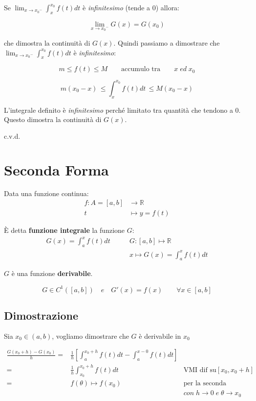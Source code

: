\documentclass[../dimostrazioni]{subfiles}
\begin{document}
                Se \( \lim_{x \to {x_0}^{-}} \int_{x}^{x_0} f(t) dt \) è \emph{infinitesimo} (tende a 0) allora:

                \[  \lim_{x \to {x_0}^{-}}G(x) = G(x_0) \]

                che dimostra la continuità di \(G(x)\). Quindi passiamo a dimostrare che \( \lim_{x \to {x_0}^{-}} \int_{x}^{x_0} f(t) dt \) è \emph{infinitesimo}:

                \[m \leqslant f(t) \leqslant M \qquad \text {accumulo tra} \qquad x \; ed \; x_0 \]

                \[m(x_0-x) \, \leqslant \int_{x}^{x_0} f(t) dt \, \leqslant M(x_0-x) \]

                L'integrale definito è \emph{infinitesimo} perché limitato tra quantità che tendono a 0. Questo dimostra la continuità di \(G(x)\).

                c.v.d.
            
        \section*{Seconda Forma}

        Data una funzione continua:
        \begin{align*}
            f : A = [a, b] &\longrightarrow \mathbb{R}\\
            t &\longmapsto y = f(t) 
        \end{align*}

        È detta \textbf{funzione integrale} la funzione \(G\):
        \begin{align*}
            G(x) = \int_{a}^{x} f(t) dt \qquad   &{G : [a, b] \longmapsto \mathbb{R}} \\
            &{x \longmapsto G(x) = \int_{a}^{x} f(t) dt}
        \end{align*}

        \(G\) è una funzione \textbf{derivabile}.

        \[G \in C^{1}([a, b]) \quad e \quad G'(x) = f(x) \qquad \forall x \in [a,b] \]
        
            \subsection*{Dimostrazione}

                Sia \(x_0 \in (a,b) \), vogliamo dimostrare che \(G\) è derivabile in \(x_0\)

                \begin{align*}
                    \frac{G(x_0+h) - G(x_0)}{h} =& \frac{1}{h} \left[ \int_{a}^{x_0+h} f(t) dt - \int_{a}^{x-0} f(t)dt \right] \\
                    =& \frac{1}{h} \int_{x_0}^{x_0+h}f(t) dt & \text{VMI dif su} [x_0, {x_0} +h]\\
                    =& f(\theta) \longmapsto f(x_0)  & \text{per la seconda proprietà del VMI}& \\
                    &                                &  con \; h \rightarrow 0 \; e \; \theta \rightarrow x_0&
                \end{align*}
\end{document}
